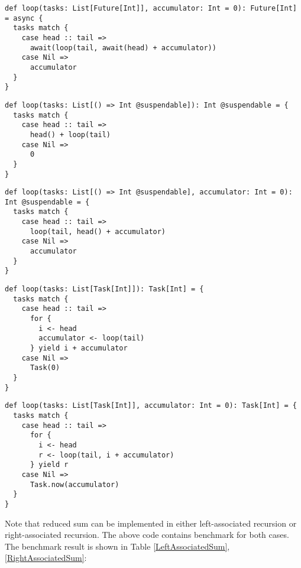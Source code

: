 \begin{lstlisting}[float=htbp,caption={Right-associated sum based on Scala Async},label={RightAssociatedSum.future}]
def loop(tasks: List[Future[Int]], accumulator: Int = 0): Future[Int] = async {
  tasks match {
    case head :: tail =>
      await(loop(tail, await(head) + accumulator))
    case Nil =>
      accumulator
  }
}
\end{lstlisting}

\begin{lstlisting}[float=htbp,caption={Left-associated sum based on Scala Continuation plug-in},label={LeftAssociatedSum.scalaContinuation}]
def loop(tasks: List[() => Int @suspendable]): Int @suspendable = {
  tasks match {
    case head :: tail =>
      head() + loop(tail)
    case Nil =>
      0
  }
}
\end{lstlisting}

\begin{lstlisting}[float=htbp,caption={Right-associated sum based on Scala Continuation plug-in},label={RightAssociatedSum.scalaContinuation}]
def loop(tasks: List[() => Int @suspendable], accumulator: Int = 0): Int @suspendable = {
  tasks match {
    case head :: tail =>
      loop(tail, head() + accumulator)
    case Nil =>
      accumulator
  }
}
\end{lstlisting}

\begin{lstlisting}[float=htbp,caption={Left-associated sum based on \lstinline{for} comprehension},label={LeftAssociatedSum.scalaz}]
def loop(tasks: List[Task[Int]]): Task[Int] = {
  tasks match {
    case head :: tail =>
      for {
        i <- head
        accumulator <- loop(tail)
      } yield i + accumulator
    case Nil =>
      Task(0)
  }
}
\end{lstlisting}

\begin{lstlisting}[float=htbp,caption={Right-associated sum based on \lstinline{for} comprehension},label={RightAssociatedSum.scalaz}]
def loop(tasks: List[Task[Int]], accumulator: Int = 0): Task[Int] = {
  tasks match {
    case head :: tail =>
      for {
        i <- head
        r <- loop(tail, i + accumulator)
      } yield r
    case Nil =>
      Task.now(accumulator)
  }
}
\end{lstlisting}

Note that reduced sum can be implemented in either left-associated recursion or right-associated recursion. The above code contains benchmark for both cases. The benchmark result is shown in Table \ref{LeftAssociatedSum}, \ref{RightAssociatedSum}:

